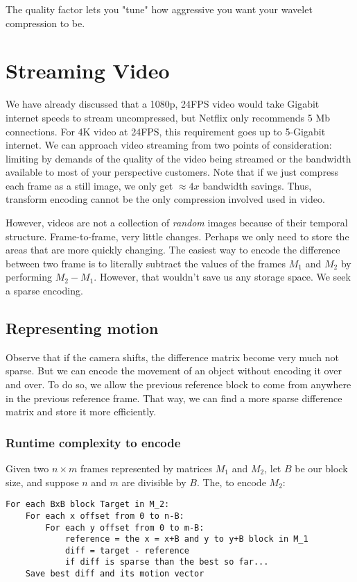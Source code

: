 \documentclass[titlepage, 12pt, leqno]{article}
\begin{document}
\begin{note}
    The quality factor lets you "tune" how aggressive you want your wavelet
    compression to be.
\end{note}

\pagebreak
\section{Streaming Video}
We have already discussed that a 1080p, 24FPS video would take Gigabit internet
speeds to stream uncompressed, but Netflix only recommends 5 Mb connections. For
4K video at 24FPS, this requirement goes up to 5-Gigabit internet. We can approach
video streaming from two points of consideration: limiting by demands of the
quality of the video being streamed or the bandwidth available to most of your
perspective customers. Note that if we just compress each frame as a still image,
we only get $\approx 4x$ bandwidth savings. Thus, transform encoding cannot be the
only compression involved used in video.

However, videos are not a collection of \textit{random} images because of their
temporal structure. Frame-to-frame, very little changes. Perhaps we only need to
store the areas that are more quickly changing. The easiest way to encode the
difference between two frame is to literally subtract the values of the frames
$M_{1}$ and $M_{2}$ by performing $M_{2}-M_{1}$. However, that wouldn't save us
any storage space. We seek a sparse encoding.

\subsection{Representing motion}
Observe that if the camera shifts, the difference matrix become very much not
sparse. But we can encode the movement of an object without encoding it over and
over. To do so, we allow the previous reference block to come from anywhere in the
previous reference frame. That way, we can find a more sparse difference matrix
and store it more efficiently.

\subsubsection{Runtime complexity to encode}
Given two $n\times m$ frames represented by matrices $M_{1}$ and $M_{2}$, let $B$
be our block size, and suppose $n$ and $m$ are divisible by $B$. The, to encode
$M_{2}$:
\begin{verbatim}
For each BxB block Target in M_2:
    For each x offset from 0 to n-B:
        For each y offset from 0 to m-B:
            reference = the x = x+B and y to y+B block in M_1
            diff = target - reference
            if diff is sparse than the best so far...
    Save best diff and its motion vector
\end{verbatim}
\end{document}
